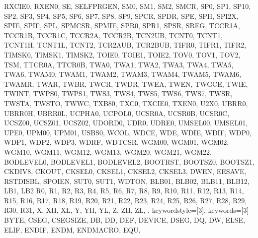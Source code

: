 {{                RXCIE0, RXEN0,
                SE, SELFPRGEN, SM0, SM1, SM2, SMCR, SP0, SP1,
                SP10,
                SP2, SP3, SP4, SP5, SP6, SP7, SP8, SP9,
                SPCR, SPDR, SPE, SPH, SPI2X, SPIE, SPIF, SPL,
                SPMCSR, SPMIE, SPR0, SPR1, SPSR, SREG,
                TCCR1A, TCCR1B, TCCR1C, TCCR2A, TCCR2B, TCN2UB,
                TCNT0, TCNT1, TCNT1H, TCNT1L, TCNT2, TCR2AUB,
                TCR2BUB, TIFR0, TIFR1, TIFR2, TIMSK0, TIMSK1,
                TIMSK2, TOIE0, TOIE1, TOIE2, TOV0, TOV1, TOV2,
                TSM, TTCR0A, TTCR0B, TWA0, TWA1, TWA2, TWA3,
                TWA4, TWA5, TWA6, TWAM0, TWAM1, TWAM2, TWAM3,
                TWAM4, TWAM5, TWAM6, TWAMR, TWAR, TWBR, TWCR,
                TWDR, TWEA, TWEN, TWGCE, TWIE, TWINT,
                TWPS0, TWPS1, TWS3, TWS4, TWS5, TWS6, TWS7,
                TWSR, TWSTA, TWSTO, TWWC, TXB80, TXC0, TXCIE0,
                TXEN0,
                U2X0, UBRR0, UBRR0H, UBRR0L, UCPHA0, UCPOL0,
                UCSR0A, UCSR0B, UCSR0C, UCSZ00, UCSZ01, UCSZ02,
                UDORD0, UDR0, UDRE0, UMSEL00, UMSEL01, UPE0,
                UPM00, UPM01, USBS0,
                WCOL, WDCE, WDE, WDIE, WDIF, WDP0, WDP1, WDP2,
                WDP3, WDRF, WDTCSR, WGM00, WGM01, WGM02, WGM10,
                WGM11, WGM12, WGM13, WGM20, WGM21, WGM22,
                BODLEVEL0, BODLEVEL1, BODLEVEL2,
                BOOTRST, BOOTSZ0, BOOTSZ1,
                CKDIV8, CKOUT,
                CKSEL0, CKSEL1, CKSEL2, CKSEL3,
                DWEN, EESAVE, RSTDISBL, SPOIEN,
                SUT0, SUT1, WDTON,
                BLB01, BLB02, BLB11, BLB12,
                LB1, LB2
                R0,  R1,  R2,  R3,  R4,  R5,  R6,  R7,  R8,
                R9,  R10, R11, R12, R13, R14, R15, R16, R17,
                R18, R19, R20, R21, R22, R23, R24, R25, R26,
                R27, R28, R29, R30, R31,
                X, XH, XL, Y, YH, YL, Z, ZH, ZL,
                },
%
%
  keywordstyle=[3]\color{arduinoOrange},
  keywords=[3]{  %
                BYTE,
                CSEG, CSEGSIZE,
                DB, DD, DEF, DEVICE, DSEG, DQ, DW,
                ELSE, ELIF, ENDIF, ENDM, ENDMACRO, EQU,
}}
